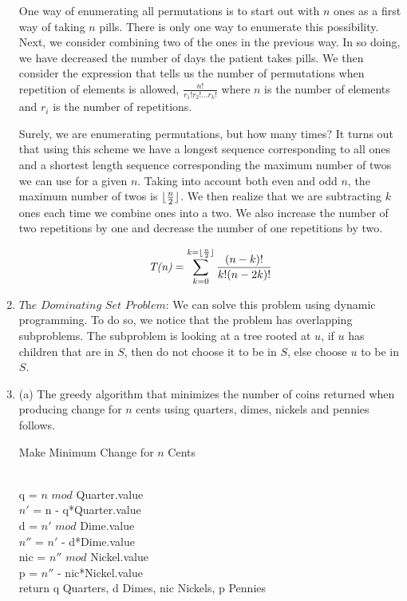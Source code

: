 \documentclass[]{report}
\DeclarePairedDelimiter{\floor}{\lfloor}{\rfloor}
\begin{document}
\begin{enumerate}
	One way of enumerating all permutations is to start out with $\textit{n}$ ones as a first way of taking $\textit{n}$ pills. There is only one way to enumerate this possibility.  Next, we consider combining two of the ones in the previous way. In so doing, we have decreased the number of days the patient takes pills. We then consider the expression that tells us the number of permutations when repetition of elements is allowed, $\frac{n!}{r_{1}!r_{2}!...r_{k}!}$ where $\textit{n}$ is the number of elements and $r_{i}$ is the number of repetitions. 
	
	Surely, we are enumerating permutations, but how many times? It turns out that using this scheme we have a longest sequence corresponding to all ones and a shortest length sequence corresponding the maximum number of twos we can use for a given $ \textit{n} $. Taking into account both even and odd $ \textit{n} $, the maximum number of twos is $ \floor{\frac{n}{2}} $. We then realize that we are subtracting $ \textit{k} $ ones each time we combine ones into a two. We also increase the number of two repetitions by one and decrease the number of one repetitions by two.
	
	$$\textit{T(n)} = \sum_{k=0}^{k=\floor{\frac{n}{2}}} \frac{(n-k)!}{k!(n-2k)!}  $$	
	
	
	\item $ \textit{The Dominating Set Problem} $: We can solve this problem using dynamic programming. To do so, we notice that the problem has overlapping subproblems. The subproblem is looking at a tree rooted at $ u $, if $ u $ has children that are in $ S $, then do not choose it to be in $ S $, else choose $ u $ to be in $ S $.
	
	\item 
	(a) The greedy algorithm that minimizes the number of coins returned when producing change for $ \textit{n} $ cents using quarters, dimes, nickels and pennies follows.
	
	\begin{algorithm}
	\caption{Make Minimum Change for $ \textit{n} $ Cents }
	\label{MakeChange}
	\begin{algorithmic}[1]
		 \\		
	    q =  $n$  $mod$ Quarter.value \\
		$n'$ = n - q*Quarter.value \\
		d = $n'$ $mod$ Dime.value \\
		$n''$ = $n'$ - d*Dime.value \\
		nic = $n''$ $mod$ Nickel.value \\
		p = $n''$ - nic*Nickel.value \\
		return q Quarters, d Dimes, nic Nickels, p Pennies
		\EndProcedure
		\end{algorithmic}
	\end{algorithm}
	

\end{enumerate}
\end{document}
